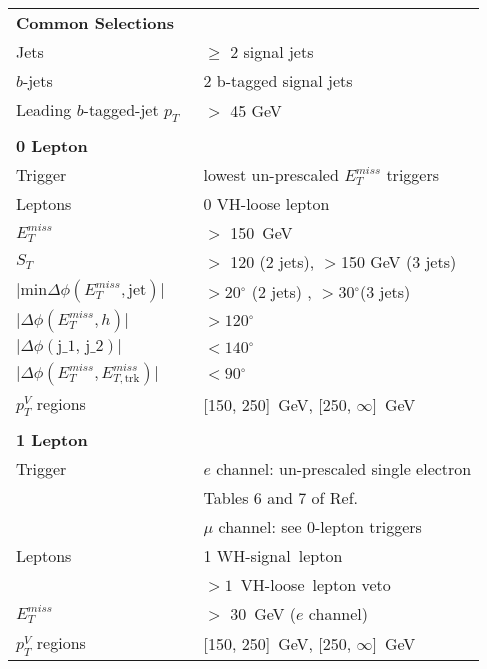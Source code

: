 \begin{table}[h]
\begin{center}
\begin{tabular}{l l} 

\toprule
\multicolumn{2}{l}{\textbf{Common Selections}}\\
Jets & $\geq$  2 signal jets  \\
$b$-jets &  2 b-tagged signal jets \\
Leading $b$-tagged-jet $p_T$\  & $>$ 45 GeV \\
  &\\
\multicolumn{2}{l}{\textbf{0 Lepton}} \\
Trigger & lowest un-prescaled $E_T^{miss}$ triggers \\
Leptons & 0 VH-loose lepton \\
$E_T^{miss}$ & $>$ 150~GeV  \\
$S_T$ & $>$ 120 (2 jets), $>$150 GeV (3 jets)  \\
$\lvert \text{min} \Delta \phi (E_T^{miss}, \text{jet}) \rvert$ & $> 20\ensuremath{^\circ}$ (2 jets) , $> 30\ensuremath{^\circ}$(3 jets) \\
  $\lvert \Delta\phi(E_T^{miss}, h) \rvert$ & $> 120\ensuremath{^\circ}$ \\
$\lvert \Delta\phi(\text{j_1, j_2}) \rvert$ & $< 140\ensuremath{^\circ}$ \\
$\lvert \Delta\phi(E_T^{miss}, E_{T, \text{trk}}^{miss}) \rvert$ & $< 90\ensuremath{^\circ}$ \\
$p_T^V$ regions & [150, 250]~GeV, [250, $\infty$]~GeV  \\

&\\
\multicolumn{2}{l}{\textbf{1 Lepton}} \\
Trigger &  $e$ channel: un-prescaled single electron \\
        & Tables 6 and 7 of Ref.~\cite{VHobjectsupportnote}\\
	    & $\mu$ channel: see 0-lepton triggers \\
Leptons & 1 WH-signal\ lepton \\
        &  $>1$~VH-loose\ lepton veto \\
$E_T^{miss}$   & $>$ 30~GeV ($e$ channel) \\
$p_T^{V}$ regions & [150, 250]~GeV, [250, $\infty$]~GeV  \\ 



\end{tabular}
\end{center}
\end{table}

